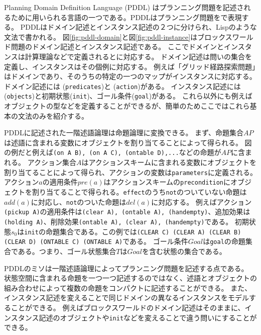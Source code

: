 Planning Domain Definition Language (PDDL) \cite{aeronautiques1998pddl}はプランニング問題を記述されるために用いられる言語の一つである。PDDLはプランニング問題をで表現する。
PDDLはドメイン記述とインスタンス記述の２つに分けられ、Lispのような文法で書かれる。
図\ref{fig:pddl-domain}と図\ref{fig:pddl-instance}はブロックスワールド問題のドメイン記述とインスタンス記述である。
ここでドメインとインスタンスは計算理論などで定義されるとに対応する。
ドメイン記述は問いの集合を定義し、インスタンスはその個例に対応する。
例えば「グリッド経路探索問題」はドメインであり、そのうちの特定の一つのマップがインスタンスに対応する。
ドメイン記述には (\texttt{predicates})と (\texttt{action})がある。
インスタンス記述には (\texttt{objects})と初期状態(\texttt{init})、ゴール条件(\texttt{goal})がある。
これら以外にも例えばオブジェクトの型などを定義することができるが、簡単のためここではこれら基本の文法のみを紹介する。

PDDLに記述された一階述語論理は命題論理に変換できる。
まず、命題集合$AP$は述語に含まれる変数にオブジェクトを割り当てることによって得られる。
図の例だと例えば\texttt{(on A B), (on A C), (ontable D),...}などの命題が$AP$に含まれる。
アクション集合$A$はアクションスキームに含まれる変数にオブジェクトを割り当てることによって得られ、アクションの変数は\texttt{parameters}に定義される。
アクション$a$の適用条件$pre(a)$はアクションスキームの\texttt{precondition}にオブジェクトを割り当てることで得られる。\texttt{effect}のうち\texttt{not}のついていない命題は$add(a)$に対応し、\texttt{not}のついた命題は$del(a)$に対応する。
例えばアクション\texttt{(pickup A)}の適用条件は{\texttt{(clear A), (ontable A), (handempty)}}、追加効果は{\texttt{(holding A)}}、削除効果{\texttt{(ontable A), (clear A), (handempty)}}である。
初期状態$s_0$は\texttt{init}の命題集合である。この例では{\texttt{(CLEAR C) (CLEAR A) (CLEAR B) (CLEAR D) (ONTABLE C) (ONTABLE A)}}である。
ゴール条件$Goal$は\texttt{goal}の命題集合である。つまり、ゴール状態集合$T$は$Goal$を含む状態の集合である。

PDDLのミソは一階述語論理によってプランニング問題を記述する点である。
状態空間に含まれる命題を一つ一つ記述するのではなく、述語とオブジェクトの組み合わせによって複数の命題をコンパクトに記述することができる。
また、インスタンス記述を変えることで同じドメインの異なるインスタンスをモデルすることができる。
例えばブロックスワールドのドメイン記述はそのままに、インスタンス記述のオブジェクトや\texttt{init}などを変えることで違う問いにすることができる。

